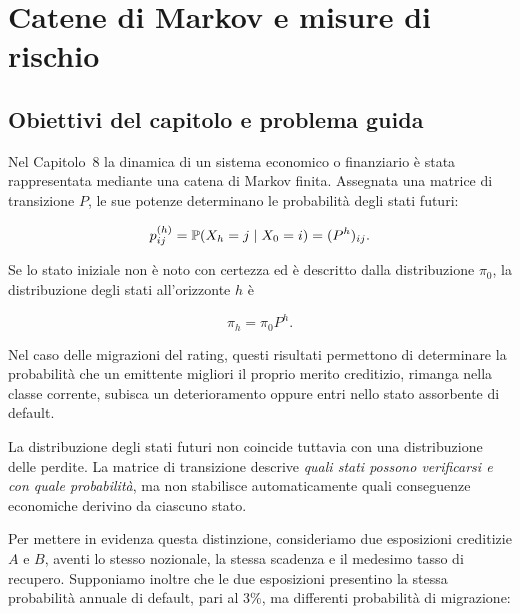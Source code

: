 



\chapter{Catene di Markov e misure di rischio}

\label{cap:markov-misure-rischio}

\section{Obiettivi del capitolo e problema guida}

\label{sec:cap9-obiettivi}

Nel Capitolo~8 la dinamica di un sistema economico o finanziario \`{e}
stata rappresentata mediante una catena di Markov finita. Assegnata una
matrice di transizione $P$, le sue potenze determinano le
probabilit\`{a} degli stati futuri:

\[
p_{ij}^{(h)}
=
\mathbb{P}(X_h=j\mid X_0=i)
=
(P^h)_{ij}.
\]

Se lo stato iniziale non \`{e} noto con certezza ed \`{e} descritto
dalla distribuzione $\pi_0$, la distribuzione degli stati
all'orizzonte $h$ \`{e}

\[
\pi_h=\pi_0P^h.
\]

Nel caso delle migrazioni del rating, questi risultati permettono di
determinare la probabilit\`{a} che un emittente migliori il proprio
merito creditizio, rimanga nella classe corrente, subisca un
deterioramento oppure entri nello stato assorbente di default.

La distribuzione degli stati futuri non coincide tuttavia con una
distribuzione delle perdite. La matrice di transizione descrive
\emph{quali stati possono verificarsi e con quale probabilit\`{a}}, ma
non stabilisce automaticamente quali conseguenze economiche derivino
da ciascuno stato.

Per mettere in evidenza questa distinzione, consideriamo due esposizioni
creditizie $A$ e $B$, aventi lo stesso nozionale, la stessa
scadenza e il medesimo tasso di recupero. Supponiamo inoltre che le due
esposizioni presentino la stessa probabilit\`{a} annuale di default,
pari al $3\%$, ma differenti probabilit\`{a} di migrazione:

